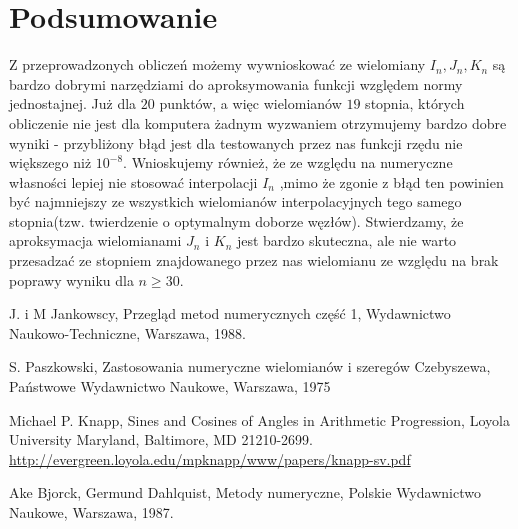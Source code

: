 \documentclass[12pt,wide]{mwart}
\begin{document}
	
\section{Podsumowanie}

Z przeprowadzonych obliczeń możemy wywnioskować ze wielomiany $I_n,J_n,K_n$ są bardzo dobrymi narzędziami do aproksymowania funkcji względem normy jednostajnej. Już dla $20$ punktów, a więc wielomianów $19$ stopnia, których obliczenie nie jest dla komputera żadnym wyzwaniem otrzymujemy bardzo dobre wyniki - przybliżony błąd jest dla testowanych przez nas funkcji rzędu nie większego niż $10^{-8}$. Wnioskujemy również, że ze względu na numeryczne własności lepiej nie stosować interpolacji $I_n$ ,mimo że zgonie z \cite[strony 105-106]{Bj} błąd ten powinien być najmniejszy ze wszystkich wielomianów interpolacyjnych tego samego stopnia(tzw. twierdzenie o optymalnym doborze węzłów). Stwierdzamy, że aproksymacja wielomianami $J_n$ i $K_n$ jest bardzo skuteczna, ale nie warto przesadzać ze stopniem znajdowanego przez nas wielomianu ze względu na brak poprawy wyniku dla $n \geq 30$. 





\begin{thebibliography}{9}
\itemsep2pt

 J. i M Jankowscy, Przegląd metod numerycznych część 1, Wydawnictwo Naukowo-Techniczne, Warszawa, 1988.

 S. Paszkowski, Zastosowania numeryczne wielomianów i szeregów Czebyszewa, Państwowe Wydawnictwo Naukowe, Warszawa, 1975
            				
 Michael P. Knapp, Sines and Cosines of Angles in Arithmetic Progression, Loyola University Maryland, Baltimore, MD 21210-2699. \url{http://evergreen.loyola.edu/mpknapp/www/papers/knapp-sv.pdf}

 Ake Bjorck, Germund Dahlquist, Metody numeryczne, Polskie Wydawnictwo Naukowe, Warszawa, 1987.
														
\end{thebibliography}
\end{document}
